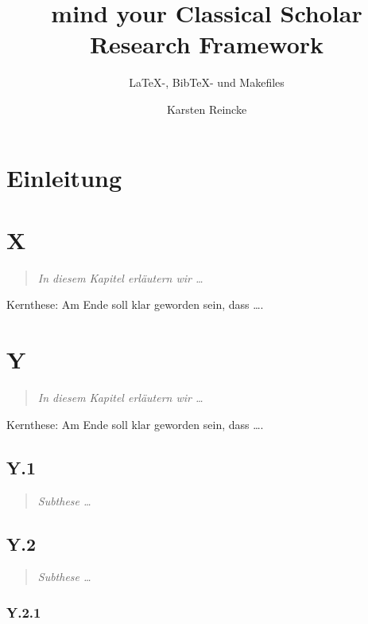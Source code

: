 \documentclass[DIV=calc,BCOR=5mm,11pt,headings=small,oneside,abstract=true,toc=bib]{scrbook}
\begin{document}
\nocite{*}

\titlehead{Geisteswissenschftliche Forschungsarbeit}
\subject{myCsrf-}
\title{mind your Classical Scholar Research Framework}
\subtitle{LaTeX-, BibTeX- und Makefiles}
\author{Karsten Reincke}
\maketitle

\footnotesize
\tableofcontents

\normalsize
\chapter{Einleitung}

\chapter{X}
\begin{quote}\itshape
In diesem Kapitel erläutern wir \ldots
\end{quote} 

Kernthese: Am Ende soll klar geworden sein, dass \ldots.

\chapter{Y}
\begin{quote}\itshape
In diesem Kapitel erläutern wir \ldots
\end{quote} 

Kernthese: Am Ende soll klar geworden sein, dass \ldots.

\section{Y.1}
\begin{quote}\itshape
Subthese \ldots
\end{quote} 

\section{Y.2}
\begin{quote}\itshape
Subthese \ldots
\end{quote} 

\subsection{Y.2.1}
\end{document}
